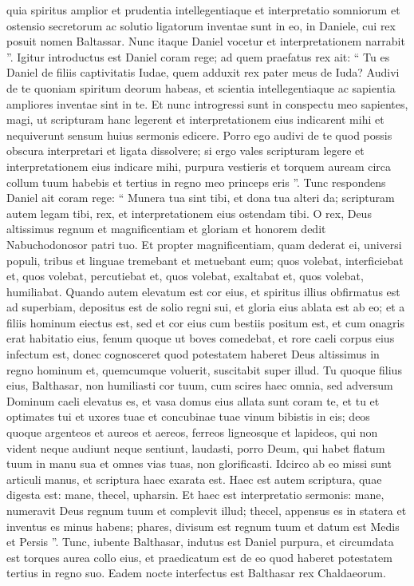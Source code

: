 \begin{biblechapter}
\begin{biblechapter}
\begin{biblechapter}
\begin{biblechapter}
\begin{biblechapter}
 \verse quia spiritus amplior et prudentia intellegentiaque et interpretatio somniorum et ostensio secretorum ac solutio ligatorum inventae sunt in eo, in Daniele, cui rex posuit nomen Baltassar. Nunc itaque Daniel vocetur et interpretationem narrabit ”.
 \verse Igitur introductus est Daniel coram rege; ad quem praefatus rex ait: “ Tu es Daniel de filiis captivitatis Iudae, quem adduxit rex pater meus de Iuda? 
\verse Audivi de te quoniam spiritum deorum habeas, et scientia intellegentiaque ac sapientia ampliores inventae sint in te. 
\verse Et nunc introgressi sunt in conspectu meo sapientes, magi, ut scripturam hanc legerent et interpretationem eius indicarent mihi et nequiverunt sensum huius sermonis edicere. 
\verse Porro ego audivi de te quod possis obscura interpretari et ligata dissolvere; si ergo vales scripturam legere et interpretationem eius indicare mihi, purpura vestieris et torquem auream circa collum tuum habebis et tertius in regno meo princeps eris ”.
 \verse Tunc respondens Daniel ait coram rege: “ Munera tua sint tibi, et dona tua alteri da; scripturam autem legam tibi, rex, et interpretationem eius ostendam tibi. 
\verse O rex, Deus altissimus regnum et magnificentiam et gloriam et honorem dedit Nabuchodonosor patri tuo. 
\verse Et propter magnificentiam, quam dederat ei, universi populi, tribus et linguae tremebant et metuebant eum; quos volebat, interficiebat et, quos volebat, percutiebat et, quos volebat, exaltabat et, quos volebat, humiliabat. 
\verse Quando autem elevatum est cor eius, et spiritus illius obfirmatus est ad superbiam, depositus est de solio regni sui, et gloria eius ablata est ab eo; 
\verse et a filiis hominum eiectus est, sed et cor eius cum bestiis positum est, et cum onagris erat habitatio eius, fenum quoque ut boves comedebat, et rore caeli corpus eius infectum est, donec cognosceret quod potestatem haberet Deus altissimus in regno hominum et, quemcumque voluerit, suscitabit super illud. 
\verse Tu quoque filius eius, Balthasar, non humiliasti cor tuum, cum scires haec omnia, 
\verse sed adversum Dominum caeli elevatus es, et vasa domus eius allata sunt coram te, et tu et optimates tui et uxores tuae et concubinae tuae vinum bibistis in eis; deos quoque argenteos et aureos et aereos, ferreos ligneosque et lapideos, qui non vident neque audiunt neque sentiunt, laudasti, porro Deum, qui habet flatum tuum in manu sua et omnes vias tuas, non glorificasti. 
\verse Idcirco ab eo missi sunt articuli manus, et scriptura haec exarata est. 
\verse Haec est autem scriptura, quae digesta est: mane, thecel, upharsin. 
\verse Et haec est interpretatio sermonis: mane, numeravit Deus regnum tuum et complevit illud; 
 \verse thecel, appensus es in statera et inventus es minus habens; 
\verse phares, divisum est regnum tuum et datum est Medis et Persis ”. 
\verse Tunc, iubente Balthasar, indutus est Daniel purpura, et circumdata est torques aurea collo eius, et praedicatum est de eo quod haberet potestatem tertius in regno suo. 
 \verse Eadem nocte interfectus est Balthasar rex Chaldaeorum.
 

\end{biblechapter}
\end{biblechapter}
\end{biblechapter}
\end{biblechapter}
\end{biblechapter}
